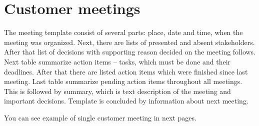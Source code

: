 \chapter{Customer meetings} \label{chap:customer_meetings}
The meeting template consist of several parts: place, date and time, when the meeting was organized.
Next, there are lists of presented and absent stakeholders.
After that list of decisions with supporting reason decided on the meeting follows.
Next table summarize action items -- tasks, which must be done and their deadlines.
After that there are listed action items which were finished since last meeting.
Last table summarize pending action items throughout all meetings.
This is followed by summary, which is text description of the meeting and important decisions.
Template is concluded by information about next meeting.

You can see example of single customer meeting in next pages.
\label{img:customermeeting}
